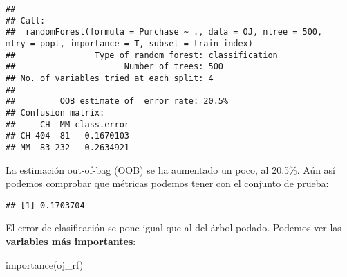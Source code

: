 \documentclass[
]{article}
\newenvironment{Shaded}{\begin{snugshade}}{\end{snugshade}}
\newcommand{\AttributeTok}[1]{\textcolor[rgb]{0.77,0.63,0.00}{#1}}
\newcommand{\FunctionTok}[1]{\textcolor[rgb]{0.00,0.00,0.00}{#1}}
\newcommand{\NormalTok}[1]{#1}
\newcommand{\OtherTok}[1]{\textcolor[rgb]{0.56,0.35,0.01}{#1}}
\newcommand{\SpecialCharTok}[1]{\textcolor[rgb]{0.00,0.00,0.00}{#1}}
\begin{document}
\begin{verbatim}
## 
## Call:
##  randomForest(formula = Purchase ~ ., data = OJ, ntree = 500,      mtry = popt, importance = T, subset = train_index) 
##                Type of random forest: classification
##                      Number of trees: 500
## No. of variables tried at each split: 4
## 
##         OOB estimate of  error rate: 20.5%
## Confusion matrix:
##     CH  MM class.error
## CH 404  81   0.1670103
## MM  83 232   0.2634921
\end{verbatim}

La estimación out-of-bag (OOB) se ha aumentado un poco, al 20.5\%. Aún
así podemos comprobar que métricas podemos tener con el conjunto de
prueba:

\begin{Shaded}
\end{Shaded}

\begin{verbatim}
## [1] 0.1703704
\end{verbatim}

El error de clasificación se pone igual que al del árbol podado. Podemos
ver las \textbf{variables más importantes}:

\begin{Shaded}
\begin{Highlighting}[]
\FunctionTok{importance}\NormalTok{(oj\_rf)}
\end{Highlighting}
\end{Shaded}
\end{document}
